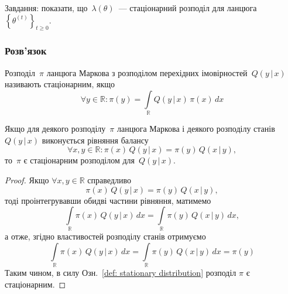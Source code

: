 \documentclass{mathreport}
\begin{document}
Завдання: показати, що~$\lambda(\theta)$~--- стаціонарний розподіл для ланцюга~$\left\{ \theta^{(t)} \right\}_{t \geqslant 0}$.

\subsubsection*{Розв'язок}

\begin{definition}\label{def: stationary distribution}
    Розподіл~$\pi$ ланцюга Маркова з розподілом перехідних імовірностей~$Q(y\, |\, x)$ називають стаціонарним, якщо
    \begin{equation}
        \forall y \in \mathbb{R}: \pi(y) = \int\limits_{\mathbb{R}} Q(y\, |\, x)\,\pi(x)\,dx
    \end{equation} 
\end{definition}

\begin{theorem}\label{theorem: detailed balance}
    Якщо для деякого розподілу~$\pi$ ланцюга Маркова і деякого розподілу станів~$Q(y\, |\, x)$ виконується рівняння балансу
    \begin{equation}
        \forall x,y \in \mathbb{R}: \pi(x)\,Q(y\, |\, x) = \pi(y)\,Q(x\, |\, y),
    \end{equation} 
    то~$\pi$ є стаціонарним розподілом для~$Q(y\, |\, x)$.

    \begin{proof}
        Якщо $\forall x,y \in \mathbb{R}$ справедливо    
        \begin{equation}
            \pi(x)\,Q(y\, |\, x) = \pi(y)\,Q(x\, |\, y),
        \end{equation} 
        тоді проінтегрувавши обидві частини рівняння, матимемо
        \begin{equation}
           \int\limits_{\mathbb{R}}\pi(x)\,Q(y\, |\, x)\,dx = \int\limits_{\mathbb{R}}\pi(y)\,Q(x\, |\, y)\,dx,
        \end{equation}
        а отже, згідно властивостей розподілу станів отримуємо
        \begin{equation}
            \int\limits_{\mathbb{R}}\pi(x)\,Q(y\, |\, x)\,dx = \int\limits_{\mathbb{R}}\pi(y)\,Q(x\, |\, y)\,dx = \pi(y)
        \end{equation}
        Таким чином, в силу Озн.~\ref{def: stationary distribution} розподіл $\pi$ є стаціонарним.
    \end{proof}
\end{theorem}
\end{document}
